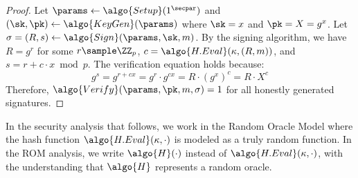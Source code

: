 \begin{proof}
  Let $\params \gets \algo{Setup}(1^\secpar)$ and $(\sk, \pk) \gets \algo{KeyGen}(\params)$ where $\sk = x$ and $\pk = X = g^x$.
  Let $\sigma = (R, s) \gets \algo{Sign}(\params, \sk, m)$.
  By the signing algorithm, we have $R = g^r$ for some $r \sample \ZZ_p$, $c = \algo{H.Eval}(\kappa, (R, m))$, and $s = r + c \cdot x \bmod p$.
  The verification equation holds because:
  \[
    g^s = g^{r + cx} = g^r \cdot g^{cx} = R \cdot (g^x)^c = R \cdot X^c
  \]
  Therefore, $\algo{Verify}(\params, \pk, m, \sigma) = 1$ for all honestly generated signatures.
\end{proof}

\begin{remark}
  In the security analysis that follows, we work in the Random Oracle Model where the hash function $\algo{H.Eval}(\kappa, \cdot)$ is modeled as a truly random function.
  In the ROM analysis, we write $\algo{H}(\cdot)$ instead of $\algo{H.Eval}(\kappa, \cdot)$, with the understanding that $\algo{H}$ represents a random oracle.
\end{remark}


